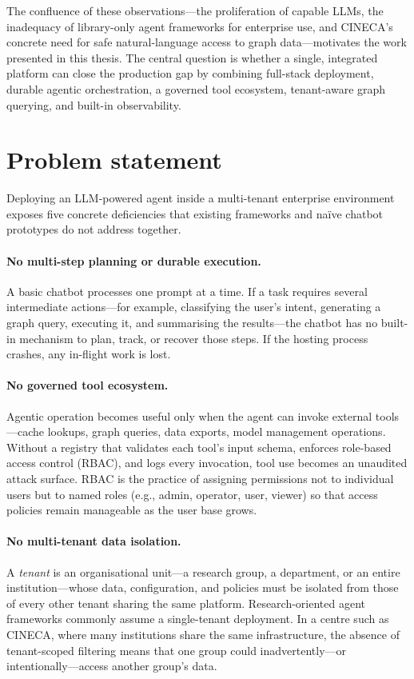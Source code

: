 \documentclass[a4paper]{sapthesis}
\begin{document}
The confluence of these observations---the proliferation of capable LLMs, the
inadequacy of library-only agent frameworks for enterprise use, and CINECA's
concrete need for safe natural-language access to graph data---motivates the
work presented in this thesis.  The central question is whether a single,
integrated platform can close the production gap by combining full-stack
deployment, durable agentic orchestration, a governed tool ecosystem,
tenant-aware graph querying, and built-in observability.

\section{Problem statement}
\label{sec:problem-statement}

Deploying an LLM-powered agent inside a multi-tenant enterprise environment
exposes five concrete deficiencies that existing frameworks and na\"ive
chatbot prototypes do not address together.

\paragraph{No multi-step planning or durable execution.}
A basic chatbot processes one prompt at a time.  If a task requires several
intermediate actions---for example, classifying the user's intent,
generating a graph query, executing it, and summarising the results---the
chatbot has no built-in mechanism to plan, track, or recover those steps.
If the hosting process crashes, any in-flight work is lost.

\paragraph{No governed tool ecosystem.}
Agentic operation becomes useful only when the agent can invoke external
tools---cache lookups, graph queries, data exports, model management
operations.  Without a registry that validates each tool's input schema,
enforces role-based access control (RBAC), and logs every invocation, tool
use becomes an unaudited attack surface.  RBAC is the practice of assigning
permissions not to individual users but to named roles (e.g., admin,
operator, user, viewer) so that access policies remain manageable as the
user base grows.

\paragraph{No multi-tenant data isolation.}
A \emph{tenant} is an organisational unit---a research group, a department, or
an entire institution---whose data, configuration, and policies must be
isolated from those of every other tenant sharing the same platform.
Research-oriented agent frameworks commonly assume a single-tenant
deployment.  In a centre such as CINECA, where many institutions share the
same infrastructure, the absence of tenant-scoped filtering means that one
group could inadvertently---or intentionally---access another group's data.
\end{document}
